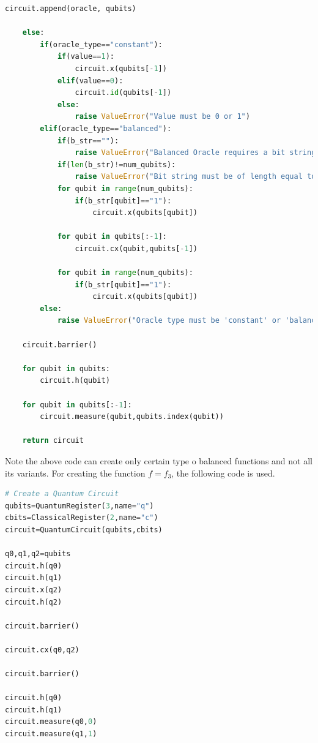 \documentclass[12pt, oneside]{book}
\theoremstyle{definition}
\theoremstyle{definition}
\theoremstyle{remark}
\begin{document}
\begin{enumerate}
\begin{lstlisting}[language=Python]
        circuit.append(oracle, qubits)
    
    else:
        if(oracle_type=="constant"):
            if(value==1):
                circuit.x(qubits[-1])
            elif(value==0):
                circuit.id(qubits[-1])
            else:
                raise ValueError("Value must be 0 or 1")
        elif(oracle_type=="balanced"):
            if(b_str==""):
                raise ValueError("Balanced Oracle requires a bit string")
            if(len(b_str)!=num_qubits):
                raise ValueError("Bit string must be of length equal to number of qubits")
            for qubit in range(num_qubits):
                if(b_str[qubit]=="1"):
                    circuit.x(qubits[qubit])
            
            for qubit in qubits[:-1]:
                circuit.cx(qubit,qubits[-1])

            for qubit in range(num_qubits):
                if(b_str[qubit]=="1"):
                    circuit.x(qubits[qubit])
        else:
            raise ValueError("Oracle type must be 'constant' or 'balanced'")
            
    circuit.barrier()

    for qubit in qubits:
        circuit.h(qubit)

    for qubit in qubits[:-1]:
        circuit.measure(qubit,qubits.index(qubit))

    return circuit
    \end{lstlisting}
    Note the above code can create only certain type o balanced functions and not all its variants. For creating the function $f=f_3$, the following code is used.
    \begin{lstlisting}[language=Python]
# Create a Quantum Circuit
qubits=QuantumRegister(3,name="q")
cbits=ClassicalRegister(2,name="c")
circuit=QuantumCircuit(qubits,cbits)

q0,q1,q2=qubits
circuit.h(q0)
circuit.h(q1)
circuit.x(q2)
circuit.h(q2)

circuit.barrier()

circuit.cx(q0,q2)

circuit.barrier()

circuit.h(q0)
circuit.h(q1)
circuit.measure(q0,0)
circuit.measure(q1,1)


\end{lstlisting}
\end{enumerate}
\end{document}

